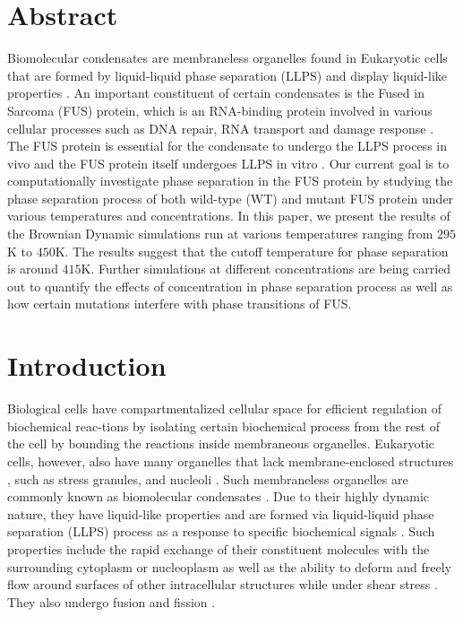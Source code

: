 \documentclass[12ptr]{article}
\begin{document}
\section{Abstract}
Biomolecular condensates are membraneless organelles found in Eukaryotic cells that are formed by liquid-liquid phase separation (LLPS) and display liquid-like properties \cite{Patel_15}. An important constituent of certain condensates is the Fused in Sarcoma (FUS) protein, which is an RNA-binding protein involved in various cellular processes such as DNA repair, RNA transport and damage response \cite{Patel_15}. The FUS protein is essential for the condensate to undergo the LLPS process in vivo and the FUS protein itself undergoes LLPS in vitro \cite{Ali_18}. Our current goal is to computationally investigate phase separation in the FUS protein by studying the phase separation process of both wild-type (WT) and mutant FUS protein under various  temperatures and concentrations. In this paper, we present the results of the Brownian Dynamic simulations run at various temperatures ranging from $295$K to $450$K. The results suggest that the cutoff temperature for phase separation is around $415$K. Further simulations at different concentrations are being carried out to quantify the effects of concentration in phase separation process as well as how certain mutations interfere with phase transitions of FUS. 

\section{Introduction}

Biological cells have compartmentalized cellular space for efficient regulation of biochemical reac-tions by isolating certain biochemical process from the rest of the cell by bounding the reactions inside membraneous organelles. Eukaryotic cells, however, also have many organelles that lack membrane-enclosed structures \cite{Mullard_19}, such as stress granules, and nucleoli \cite{Mullard_19}. Such membraneless organelles are commonly known as biomolecular condensates \cite{Banani_17}. Due to their highly dynamic nature, they have liquid-like properties and are formed via liquid-liquid phase separation (LLPS) process as a response to specific biochemical signals \cite{Banani_17}. Such properties include the rapid exchange of their constituent molecules with the surrounding cytoplasm or nucleoplasm \cite{Mullard_19} as well as the ability to deform and freely flow around surfaces of other intracellular structures while under shear stress \cite{Banani_17}. They also undergo fusion and fission \cite{Patel_15, Mullard_19, Banani_17}.\\[0.01cm]
\end{document}

